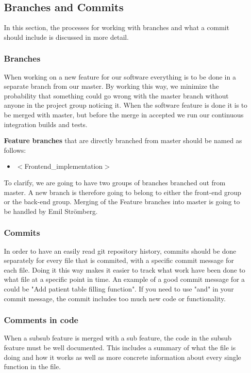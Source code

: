 \subsection{Branches and Commits}
In this section, the processes for working with branches and what a commit should include is discussed in more detail. 

\subsubsection{Branches}
When working on a new feature for our software everything is to be done in a separate branch from our master. By working this way, we minimize the probability that something could go wrong with the master branch without anyone in the project group noticing it. When the software feature is done it is to be merged with master, but before the merge in accepted we run our continuous integration builds and tests. 

\textbf{Feature branches} that are directly branched from master should be named as follows: 
\begin{itemize}
    \item $<$Frontend\_implementation$>$
\end{itemize}
To clarify, we are going to have two groups of branches branched out from master. A new branch is therefore going to belong to either the front-end group or the back-end group. Merging of the Feature branches into master is going to be handled by Emil Strömberg. 



\subsubsection{Commits}
In order to have an easily read git repository history, commits should be done separately for every file that is commited, with a specific commit message for each file. Doing it this way makes it easier to track what work have been done to what file at a specific point in time. An example of a good commit message for a could be "Add patient table filling function". If you need to use "and" in your commit message, the commit includes too much new code or functionality.

\subsubsection{Comments in code}
When a subsub feature is merged with a sub feature, the code in the subsub feature must be well documented. This includes a summary of what the file is doing and how it works as well as more concrete information about every single function in the file. 

